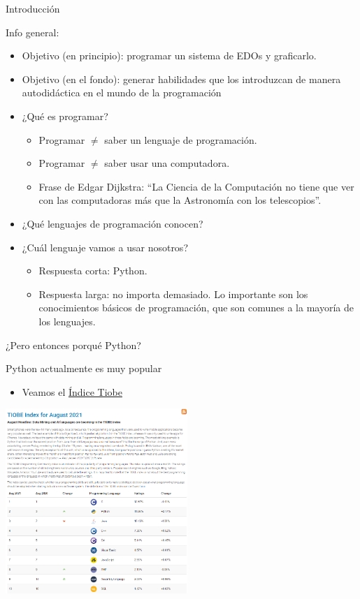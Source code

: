 \documentclass{beamer}
\begin{document}
\begin{frame}{Introducción}
  \begin{block}{Info general:}

  \end{block}\pause
  \begin{itemize}
  	\item Objetivo (en principio): programar un sistema de EDOs y graficarlo.
	\pause
	\item Objetivo (en el fondo): generar habilidades que los introduzcan de manera autodidáctica en el mundo de la programación 
	\item ¿Qué es programar? \pause
		\begin{itemize}
			\item Programar $\neq$ saber un lenguaje de programación. \pause
			\item Programar $\neq$ saber usar una computadora. \pause
			\item Frase de Edgar Dijkstra: ``La Ciencia de la Computación no tiene que ver con las computadoras más que la Astronomía con los telescopios''.\pause
		\end{itemize}
	\item ¿Qué lenguajes de programación conocen?\pause
	\item ¿Cuál lenguaje vamos a usar nosotros?\pause
	\begin{itemize}
		\item Respuesta corta: Python. \pause
		\item Respuesta larga: no importa demasiado. Lo importante  son los conocimientos básicos de programación, que son comunes a la mayoría de los lenguajes.%
	\end{itemize}
  \end{itemize}
\end{frame}

\begin{frame}{¿Pero entonces porqué Python?}
\begin{block}{Python actualmente es muy popular} 
	\begin{itemize}
		\item Veamos el \textcolor{blue}{\href{https://www.tiobe.com/tiobe-index/}{Índice Tiobe}}
	\end{itemize}
\end{block}
\begin{center}
\includegraphics[height=7cm, scale=0.5]{tiobeIndex.png}
\end{center}
\end{frame}
\end{document}
